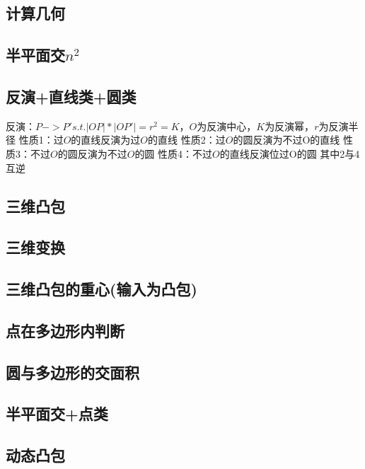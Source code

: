 \documentclass[landscape,a4paper]{article}
\begin{document}
\scriptsize
	
	
	\begin{spacing}{0.3}	
	\begin{multicols}{3}
	
	\tableofcontents
	\section{计算几何}
	\subsection{半平面交$n^2$}
	
	
	\subsection{反演+直线类+圆类}
	反演：$P->P' s.t. |OP|*|OP'|=r^2=K$，$O$为反演中心，$K$为反演幂，$r$为反演半径
	性质1：过$O$的直线反演为过$O$的直线 性质2：过$O$的圆反演为不过O的直线
	性质3：不过$O$的圆反演为不过$O$的圆 性质4：不过$O$的直线反演位过O的圆
	其中2与4互逆
	
	
	\subsection{三维凸包}
		
	\subsection{三维变换}
		
	\subsection{三维凸包的重心(输入为凸包)}
		
	\subsection{点在多边形内判断}
		
	\subsection{圆与多边形的交面积}
		
	\subsection{半平面交+点类}
		
	\subsection{动态凸包}
		

\end{multicols}
\end{spacing}
\end{document}
